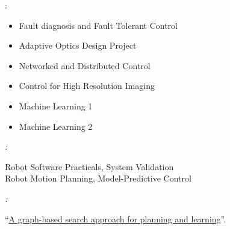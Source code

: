\begin{rSection}{}
    {%
        \begin{experienceItem}
            {}{}{:}{}
        \end{experienceItem}
        \vspace{-0.1cm}
        \begin{center}
            \begin{minipage}{0.45\textwidth}
                \begin{itemize}
                    \item Fault diagnosis and Fault Tolerant Control\\[-3ex]
                    \item Adaptive Optics Design Project\\[-3ex]
                    \item Networked and Distributed Control
                \end{itemize}
            \end{minipage}
            \begin{minipage}{0.45\textwidth}
                \begin{itemize}
                    \item Control for High Resolution Imaging\\[-3ex]
                    \item Machine Learning 1\\[-3ex]
                    \item Machine Learning 2
                \end{itemize}
            \end{minipage}
        \end{center}

        \textit{:}\hspace{0.2cm}\begin{minipage}{10cm}\vspace{\baselineskip}
        Robot Software Practicals, System Validation\\Robot Motion Planning, Model-Predictive Control\end{minipage}

        \textit{:} 
        \begin{center}``\href{https://repository.tudelft.nl/islandora/object/uuid\%3Af988aaf6-c2a7-4782-b5de-8ca6187d03ef?collection=education}{\Large A graph-based search approach for planning and learning}''. 
    \end{center}}{}

\end{rSection}
